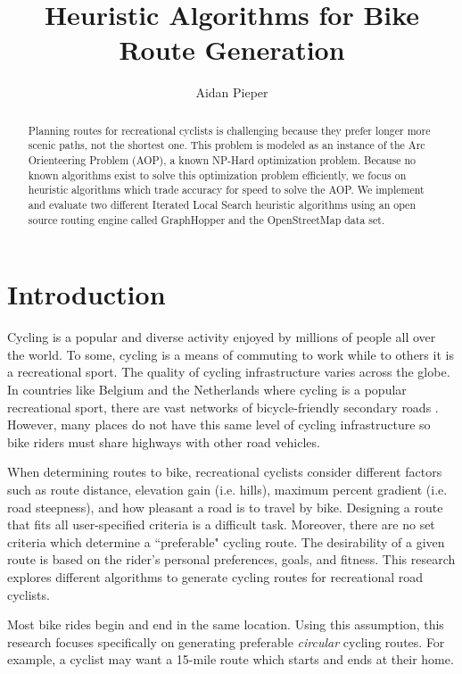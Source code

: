 \documentclass[11pt]{article}
\newcommand{\td}{\todo[inline]}
\begin{document}
\title{Heuristic Algorithms for Bike Route Generation}
\author{Aidan Pieper}
\maketitle

\begin{abstract}
Planning routes for recreational cyclists is challenging because they prefer longer more scenic paths, not the shortest one. This problem is modeled as an instance of the Arc Orienteering Problem (AOP), a known NP-Hard optimization problem. Because no known algorithms exist to solve this optimization problem efficiently, we focus on heuristic algorithms which trade accuracy for speed to solve the AOP. We implement and evaluate two different Iterated Local Search heuristic algorithms using an open source routing engine called GraphHopper and the OpenStreetMap data set.
\td{FINISH ME} 

\end{abstract}

\section{Introduction}
Cycling is a popular and diverse activity enjoyed by millions of people all over the world. To some, cycling is a means of commuting to work while to others it is a recreational sport.  The quality of cycling infrastructure varies across the globe. In countries like Belgium and the Netherlands where cycling is a popular recreational sport, there are vast networks of bicycle-friendly secondary roads \cite{souffriau2011planning}. However, many places do not have this same level of cycling infrastructure so bike riders must share highways with other road vehicles.


When determining routes to bike, recreational cyclists consider different factors such as route distance, elevation gain (i.e. hills), maximum percent gradient (i.e. road steepness), and how pleasant a road is to travel by bike. Designing a route that fits all user-specified criteria is a difficult task.  Moreover, there are no set criteria which determine a ``preferable" cycling route. The desirability of a given route is based on the rider's personal preferences, goals, and fitness. This research explores different algorithms to generate cycling routes for recreational road cyclists.


Most bike rides begin and end in the same location. Using this assumption, this research focuses specifically on generating preferable \emph{circular} cycling routes. For example, a cyclist may want a 15-mile route which starts and ends at their home.
    
\end{document}

